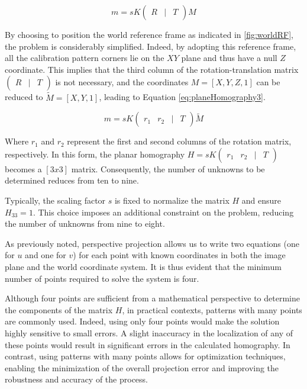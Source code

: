 \begin{equation} 
  \label{eq:planeHomography2}
  m = sK
  \begin{pmatrix}
    R & | & T 
  \end{pmatrix}
  M
\end{equation}

By choosing to position the world reference frame as indicated in \ref{fig:worldRF}, the problem is considerably simplified. Indeed, by adopting this reference frame, all the calibration pattern corners lie on the $XY$ plane and thus have a null $Z$ coordinate. This implies that the third column of the rotation-translation matrix \(\begin{pmatrix} R & | & T \end{pmatrix}\) is not necessary, and the coordinates \(M = [X, Y, Z, 1]\) can be reduced to \(\tilde{M} = [X, Y, 1]\), leading to Equation \ref{eq:planeHomography3}.

\begin{equation} 
  \label{eq:planeHomography3}
  m
  = 
  sK
  \begin{pmatrix}
    r_1 & r_2 & | & T 
    \end{pmatrix}
  \tilde{M}
\end{equation}

Where $r_1$ and $r_2$ represent the first and second columns of the rotation matrix, respectively. In this form, the planar homography $H = sK\begin{pmatrix} r_1 & r_2 & | & T \end{pmatrix}$ becomes a $[3x3]$ matrix. Consequently, the number of unknowns to be determined reduces from ten to nine.

Typically, the scaling factor $s$ is fixed to normalize the matrix $H$ and ensure $H_{33} = 1$. This choice imposes an additional constraint on the problem, reducing the number of unknowns from nine to eight.

As previously noted, perspective projection allows us to write two equations (one for $u$ and one for $v$) for each point with known coordinates in both the image plane and the world coordinate system. It is thus evident that the minimum number of points required to solve the system is four.

Although four points are sufficient from a mathematical perspective to determine the components of the matrix $H$, in practical contexts, patterns with many points are commonly used. Indeed, using only four points would make the solution highly sensitive to small errors. A slight inaccuracy in the localization of any of these points would result in significant errors in the calculated homography. In contrast, using patterns with many points allows for optimization techniques, enabling the minimization of the overall projection error and improving the robustness and accuracy of the process.

